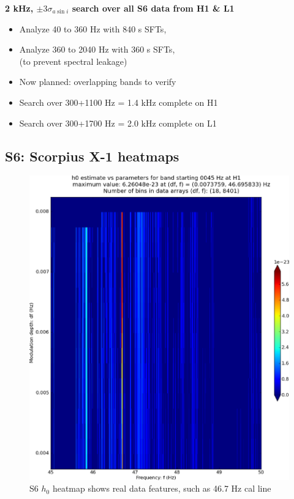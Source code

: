 \textbf{2 kHz, $\pm 3 \sigma_{a \sin i}$ search over all S6 data from H1 \& L1}
\begin{itemize}
\item Analyze 40 to 360 Hz with 840 s SFTs,
\item Analyze 360 to 2040 Hz with 360 s SFTs,\\
(to prevent spectral leakage)
\item Now planned: overlapping bands to verify
\item Search over 300+1100 Hz = 1.4 kHz complete on H1
\item Search over 300+1700 Hz = 2.0 kHz complete on L1
\end{itemize}


\subsection{S6: Scorpius X-1 heatmaps}

\begin{figure}
\begin{center}
\includegraphics[width=0.4\paperwidth,height=0.2\paperheight]{plots/DFvsFresultsh0-H1_pulsar-0045.eps}
\caption{
S6 $h_0$ heatmap shows real data features, such as 46.7 Hz cal line}
\end{center}
\end{figure}


